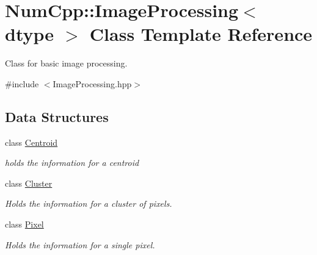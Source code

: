 \hypertarget{class_num_cpp_1_1_image_processing}{}\section{Num\+Cpp\+:\+:Image\+Processing$<$ dtype $>$ Class Template Reference}
\label{class_num_cpp_1_1_image_processing}


Class for basic image processing.  




{\ttfamily \#include $<$Image\+Processing.\+hpp$>$}

\subsection*{Data Structures}
\begin{DoxyCompactItemize}
\item 
class \mbox{\hyperlink{class_num_cpp_1_1_image_processing_1_1_centroid}{Centroid}}
\begin{DoxyCompactList}\small\item\em holds the information for a centroid \end{DoxyCompactList}\item 
class \mbox{\hyperlink{class_num_cpp_1_1_image_processing_1_1_cluster}{Cluster}}
\begin{DoxyCompactList}\small\item\em Holds the information for a cluster of pixels. \end{DoxyCompactList}\item 
class \mbox{\hyperlink{class_num_cpp_1_1_image_processing_1_1_pixel}{Pixel}}
\begin{DoxyCompactList}\small\item\em Holds the information for a single pixel. \end{DoxyCompactList}\end{DoxyCompactItemize}
